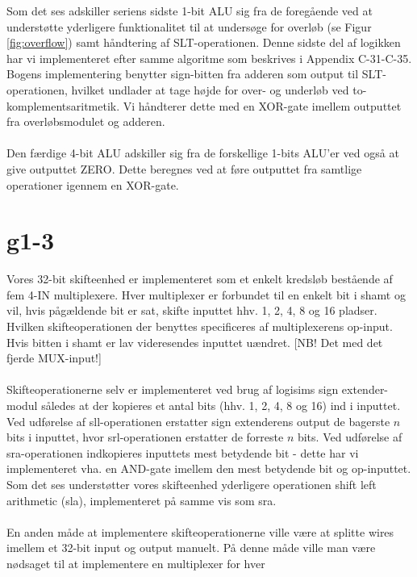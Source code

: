 \documentclass[10pt,a4paper,danish]{article}
\begin{document}
Som det ses adskiller seriens sidste 1-bit ALU sig fra de foregående ved at understøtte yderligere funktionalitet
til at undersøge for overløb (se Figur \ref{fig:overflow}) samt håndtering af SLT-operationen. Denne sidste del af 
logikken har vi implementeret efter samme algoritme som beskrives i Appendix C-31-C-35. Bogens implementering
benytter sign-bitten fra adderen som output til SLT-operationen, hvilket undlader at tage højde for 
over- og underløb ved to-komplementsaritmetik. Vi håndterer dette med en XOR-gate imellem outputtet fra 
overløbsmodulet og adderen. 
 
\paragraph{}
Den færdige 4-bit ALU adskiller sig fra de forskellige 1-bits ALU'er ved også at give outputtet ZERO. Dette 
beregnes ved at føre outputtet fra samtlige operationer igennem en XOR-gate. 

\section{g1-3}
Vores 32-bit skifteenhed er implementeret som et enkelt kredsløb bestående af fem 4-IN multiplexere. 
Hver multiplexer er forbundet til en enkelt bit i shamt og vil, hvis pågældende bit er sat, skifte 
inputtet hhv. 1, 2, 4, 8 og 16 pladser. Hvilken skifteoperationen der benyttes specificeres af 
multiplexerens op-input. Hvis bitten i shamt er lav videresendes inputtet uændret. [NB! Det med 
det fjerde MUX-input!]

\paragraph{}
Skifteoperationerne selv er implementeret ved brug af logisims sign extender-modul således at 
der kopieres et antal bits (hhv. 1, 2, 4, 8 og 16) ind i inputtet. Ved udførelse
af sll-operationen erstatter sign extenderens output de bagerste $n$ bits i inputtet, hvor 
srl-operationen erstatter de forreste $n$ bits. Ved udførelse af sra-operationen indkopieres
inputtets mest betydende bit - dette har vi implementeret vha. en AND-gate imellem den mest
betydende bit og op-inputtet. Som det ses understøtter vores skifteenhed yderligere 
operationen shift left arithmetic (sla), implementeret på samme vis som sra.

\paragraph{}
En anden måde at implementere skifteoperationerne ville være at splitte wires imellem
et 32-bit input og output manuelt. På denne måde ville man være nødsaget til at implementere
en multiplexer for hver 
\end{document}
